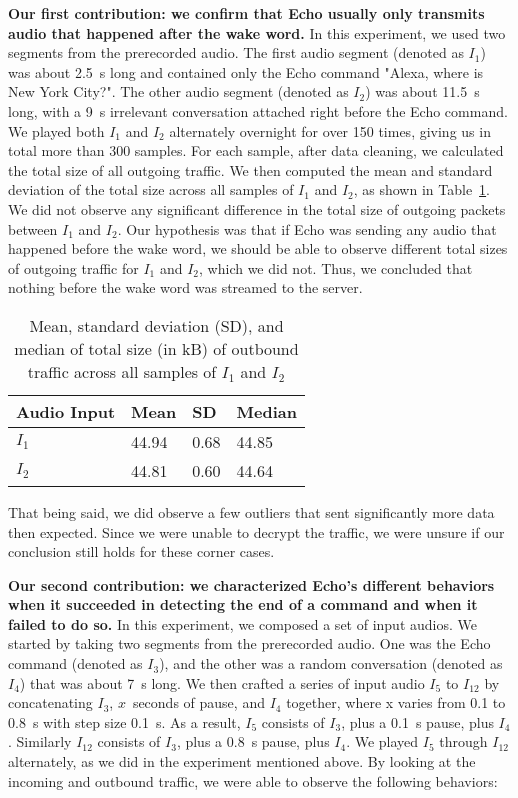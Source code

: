 \textbf{Our first contribution: we confirm that Echo usually only transmits audio that happened after the wake word.} In this experiment, we used two segments from the prerecorded audio. The first audio segment (denoted as $I_1$) was about 2.5~s long and contained only the Echo command "Alexa, where is New York City?". The other audio segment (denoted as $I_2$) was about 11.5~s long, with a 9~s irrelevant conversation attached right before the Echo command. We played both $I_1$ and $I_2$ alternately overnight for over 150 times, giving us in total more than 300 samples. For each sample, after data cleaning, we calculated the total size of all outgoing traffic. We then computed the mean and standard deviation of the total size across all samples of $I_1$ and $I_2$, as shown in Table~\ref{table1}. We did not observe any significant difference in the total size of outgoing packets between $I_1$ and $I_2$. Our hypothesis was that if Echo was sending any audio that happened before the wake word, we should be able to observe different total sizes of outgoing traffic for $I_1$ and $I_2$, which we did not. Thus, we concluded that nothing before the wake word was streamed to the server.

\begin{table}[!b]
\caption{Mean, standard deviation (SD), and median of total size (in kB) of outbound traffic across all samples of $I_1$ and $I_2$}
\begin{tabular}{llll}
\toprule
Audio Input & Mean & SD & Median \\
\midrule
$I_1$ & 44.94 & 0.68 & 44.85\\
$I_2$ & 44.81 & 0.60 & 44.64\\
\bottomrule
\end{tabular}
\label{table1}
\end{table}

That being said, we did observe a few outliers that sent significantly more data then expected. Since we were unable to decrypt the traffic, we were unsure if our conclusion still holds for these corner cases.

\textbf{Our second contribution: we characterized Echo's different behaviors when it succeeded in detecting the end of a command and when it failed to do so.} In this experiment, we composed a set of input audios. We started by taking two segments from the prerecorded audio. One was the Echo command (denoted as $I_3$), and the other was a random conversation (denoted as $I_4$) that was about 7~s long. We then crafted a series of input audio $I_5$ to $I_{12}$ by concatenating $I_3$, $x$~seconds of pause, and $I_4$ together, where x varies from 0.1 to 0.8~s with step size 0.1~s. As a result, $I_5$ consists of $I_3$, plus a 0.1~s pause, plus $I_4$. Similarly $I_{12}$ consists of $I_3$, plus a 0.8~s pause, plus $I_4$. We played $I_5$ through $I_{12}$ alternately, as we did in the experiment mentioned above. By looking at the incoming and outbound traffic, we were able to observe the following behaviors:

